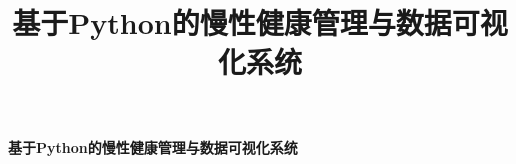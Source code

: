 \documentclass[withoutpreface,bwprint]{format}
\title{基于Python的慢性健康管理与数据可视化系统}
\begin{document}
{\centering{}\bfseries 基于Python的慢性健康管理与数据可视化系统\par}

\setcounter{page}{1}

\thispagestyle{empty}


\thispagestyle{empty}

\tableofcontents
\thispagestyle{empty}
\newpage

\setcounter{page}{1}


















\newpage



\newpage

\end{document}
